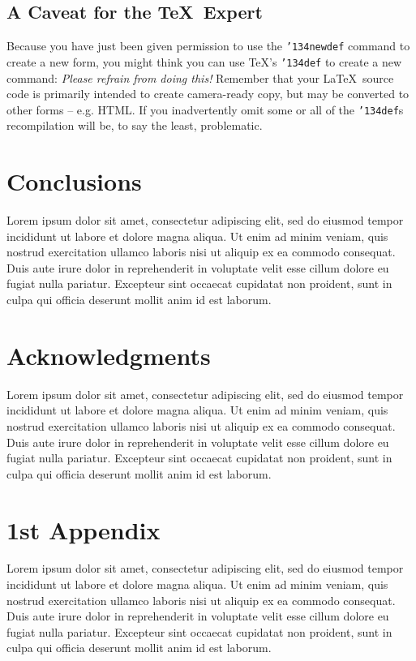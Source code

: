 \documentclass{sig-alternate-05-2015}
\begin{document}
\subsection*{A {\secit Caveat} for the \TeX\ Expert}
Because you have just been given permission to use the \texttt{{\char'134}newdef} command to create a new form, you might think you can use \TeX's \texttt{{\char'134}def} to create a new command: \textit{Please refrain from doing this!} Remember that your \LaTeX\ source code is primarily intended to create camera-ready copy, but may be converted to other forms -- e.g. HTML. If you inadvertently omit some or all of the \texttt{{\char'134}def}s recompilation will be, to say the least, problematic.

\section{Conclusions}
Lorem ipsum dolor sit amet, consectetur adipiscing elit, sed do eiusmod tempor incididunt ut labore et dolore magna aliqua. Ut enim ad minim veniam, quis nostrud exercitation ullamco laboris nisi ut aliquip ex ea commodo consequat. Duis aute irure dolor in reprehenderit in voluptate velit esse cillum dolore eu fugiat nulla pariatur. Excepteur sint occaecat cupidatat non proident, sunt in culpa qui officia deserunt mollit anim id est laborum.

\section{Acknowledgments}
Lorem ipsum dolor sit amet, consectetur adipiscing elit, sed do eiusmod tempor incididunt ut labore et dolore magna aliqua. Ut enim ad minim veniam, quis nostrud exercitation ullamco laboris nisi ut aliquip ex ea commodo consequat. Duis aute irure dolor in reprehenderit in voluptate velit esse cillum dolore eu fugiat nulla pariatur. Excepteur sint occaecat cupidatat non proident, sunt in culpa qui officia deserunt mollit anim id est laborum.





\appendix
\section{1st Appendix}
Lorem ipsum dolor sit amet, consectetur adipiscing elit, sed do eiusmod tempor incididunt ut labore et dolore magna aliqua. Ut enim ad minim veniam, quis nostrud exercitation ullamco laboris nisi ut aliquip ex ea commodo consequat. Duis aute irure dolor in reprehenderit in voluptate velit esse cillum dolore eu fugiat nulla pariatur. Excepteur sint occaecat cupidatat non proident, sunt in culpa qui officia deserunt mollit anim id est laborum.
\end{document}
